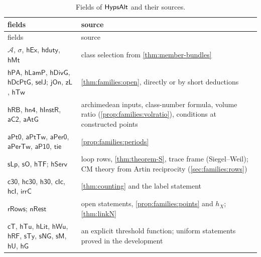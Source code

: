 {\small
\begin{longtable}{>{\raggedright\arraybackslash}p{}>{\raggedright\arraybackslash}p{}}
\caption{Fields of $\mathsf{HypsAlt}$ and their sources.}\label{tab:families:fields}\\
\toprule
fields & source\\
\midrule
\endfirsthead
\toprule
fields & source\\
\midrule
\endhead
$\mathcal A$, $\sigma$, $\mathsf{hEx}$, $\mathsf{hduty}$, $\mathsf{hMt}$ & class selection from
\cref{thm:member-bundles}\\
$\mathsf{hPA}$, $\mathsf{hLamP}$, $\mathsf{hDivG}$, $\mathsf{hDcPtG}$, $\mathsf{selJ}$; $\mathsf{jOn}$, $\mathsf{zL}$,
$\mathsf{hTw}$ & \cref{thm:families:open}, directly or by short deductions\\
$\mathsf{hRB}$, $\mathsf{hn4}$, $\mathsf{hInstR}$, $\mathsf{aC2}$, $\mathsf{aAtG}$ & archimedean inputs, class-number
formula, volume ratio (\cref{prop:families:volratio}), conditions at constructed points\\
$\mathsf{aPt0}$, $\mathsf{aPtTw}$, $\mathsf{aPer0}$, $\mathsf{aPerTw}$, $\mathsf{aP10}$, $\mathsf{tie}$ &
\cref{prop:families:periods}\\
$\mathsf{sLp}$, $\mathsf{sO}$, $\mathsf{hTF}$; $\mathsf{hServ}$ & loop rows, \cref{thm:theorem-S}, trace frame
(Siegel--Weil); CM theory from Artin reciprocity (\cref{sec:families:rows})\\
$\mathsf{c30}$, $\mathsf{hc30}$, $\mathsf{h30}$, $\mathsf{cIc}$, $\mathsf{hcI}$, $\mathsf{irrC}$ & \cref{thm:counting}
and the label statement\\
$\mathsf{rRows}$; $\mathsf{nRest}$ & open statements, \cref{prop:families:points} and $h_X$; \cref{thm:linkN}\\
$\mathsf{cT}$, $\mathsf{hTu}$, $\mathsf{hLit}$, $\mathsf{hWu}$, $\mathsf{hRF}$, $\mathsf{sTy}$, $\mathsf{sNG}$,
$\mathsf{sM}$, $\mathsf{hU}$, $\mathsf{hG}$ & an explicit threshold function; uniform statements proved in the
development\\
\bottomrule
\end{longtable}
}
